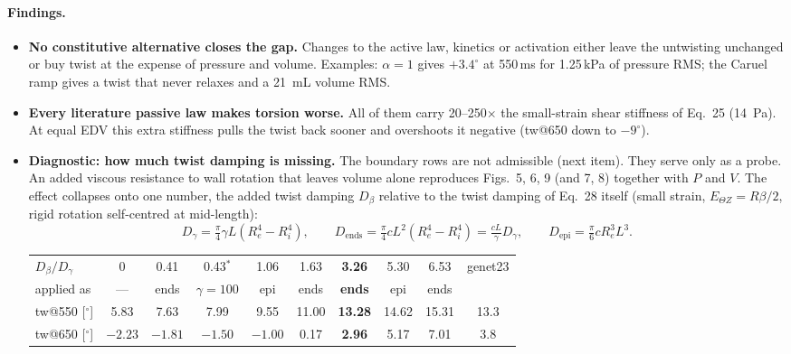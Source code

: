 \documentclass[10pt]{article}
\begin{document}
\paragraph{Findings.}
\begin{itemize}
\item \textbf{No constitutive alternative closes the gap.} Changes to the active law, kinetics or
  activation either leave the untwisting unchanged or buy twist at the expense of pressure and
  volume. Examples: $\alpha=1$ gives $+3.4^\circ$ at 550\,ms for 1.25\,kPa of pressure RMS; the
  Caruel ramp gives a twist that never relaxes and a \SI{21}{mL} volume RMS.
\item \textbf{Every literature passive law makes torsion worse.} All of them carry 20--250$\times$
  the small-strain shear stiffness of Eq.~25 (\SI{14}{Pa}). At equal EDV this extra stiffness
  pulls the twist back sooner and overshoots it negative (tw@650 down to $-9^\circ$).
\item \textbf{Diagnostic: how much twist damping is missing.} The boundary rows are not
  admissible (next item). They serve only as a probe. An added viscous resistance to wall
  rotation that leaves volume alone reproduces Figs.~5, 6, 9 (and 7, 8) together with $P$ and
  $V$. The effect collapses onto one number, the added twist damping $D_\beta$ relative to the
  twist damping of Eq.~28 itself (small strain, $E_{\Theta Z}=R\beta/2$, rigid rotation
  self-centred at mid-length):
  \begin{equation*}
  D_\gamma=\tfrac{\pi}{4}\gamma L(R_e^4-R_i^4),\qquad
  D_\text{ends}=\tfrac{\pi}{4}cL^2(R_e^4-R_i^4)=\tfrac{cL}{\gamma}D_\gamma,\qquad
  D_\text{epi}=\tfrac{\pi}{6}cR_e^3L^3 .
  \end{equation*}
  \begin{center}\small\begin{tabular}{lccccccccc}
  \toprule
  $D_\beta/D_\gamma$ & 0 & 0.41 & 0.43$^*$ & 1.06 & 1.63 & \textbf{3.26} & 5.30 & 6.53 & genet23 \\
  applied as & --- & ends & $\gamma{=}100$ & epi & ends & \textbf{ends} & epi & ends & \\ \midrule
  tw@550 [$^\circ$] & 5.83 & 7.63 & 7.99 & 9.55 & 11.00 & \textbf{13.28} & 14.62 & 15.31 & 13.3 \\
  tw@650 [$^\circ$] & $-2.23$ & $-1.81$ & $-1.50$ & $-1.00$ & 0.17 & \textbf{2.96} & 5.17 & 7.01 & 3.8 \\
  \bottomrule
  \end{tabular}\end{center}

\end{itemize}
\end{document}
